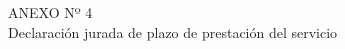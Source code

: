 \begin{center}
    \vspace*{\fill} %
    \Huge %
    ANEXO Nº 4 \\
    Declaración jurada de plazo de prestación del servicio
    \vspace*{\fill} %
\end{center}